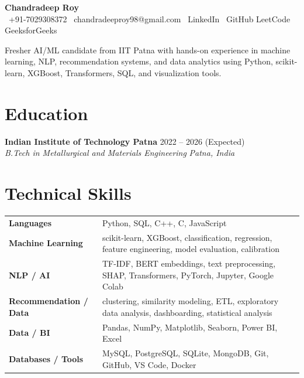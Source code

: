 \documentclass[9pt,letterpaper]{article}
\newcommand{\resumeHeader}[1]{{\LARGE\bfseries\color{accent} #1}}
\newcommand{\roleline}[4]{
  \textbf{#1} \hfill {\small #2} \\
  {\small\textit{#3}} \hfill {\small\textit{#4}} \\
}
\begin{document}
\begin{center}
    \resumeHeader{Chandradeep Roy}\\[5pt]
    {\footnotesize
    \faPhone\ +91-7029308372 \hspace{10pt}
    \faEnvelope\ chandradeeproy98@gmail.com \hspace{10pt}
    \faLinkedin\ LinkedIn \hspace{10pt}
    \faGithub\ GitHub \hspace{10pt}
    LeetCode \hspace{10pt}
    GeeksforGeeks
    }
\end{center}

{\footnotesize\color{textgray}
Fresher AI/ML candidate from IIT Patna with hands-on experience in machine learning, NLP, recommendation systems, and data analytics using Python, scikit-learn, XGBoost, Transformers, SQL, and visualization tools.
}

\section*{Education}
\roleline{Indian Institute of Technology Patna}{2022 -- 2026 (Expected)}{B.Tech in Metallurgical and Materials Engineering}{Patna, India}

\section*{Technical Skills}
\begin{tabularx}{\textwidth}{@{}>{\bfseries}p{} X@{}}
Languages & Python, SQL, C++, C, JavaScript \\
Machine Learning & scikit-learn, XGBoost, classification, regression, feature engineering, model evaluation, calibration \\
NLP / AI & TF-IDF, BERT embeddings, text preprocessing, SHAP, Transformers, PyTorch, Jupyter, Google Colab \\
Recommendation / Data & clustering, similarity modeling, ETL, exploratory data analysis, dashboarding, statistical analysis \\
Data / BI & Pandas, NumPy, Matplotlib, Seaborn, Power BI, Excel \\
Databases / Tools & MySQL, PostgreSQL, SQLite, MongoDB, Git, GitHub, VS Code, Docker \\
\end{tabularx}
\end{document}
